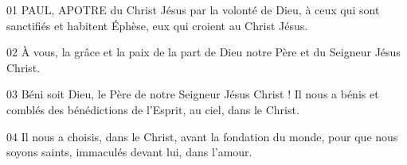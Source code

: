 01 PAUL, APOTRE du Christ Jésus par la volonté de Dieu, à ceux qui sont sanctifiés et habitent Éphèse, eux qui croient au Christ Jésus.

02 À vous, la grâce et la paix de la part de Dieu notre Père et du Seigneur Jésus Christ.

03 Béni soit Dieu, le Père de notre Seigneur Jésus Christ ! Il nous a bénis et comblés des bénédictions de l’Esprit, au ciel, dans le Christ.

04 Il nous a choisis, dans le Christ, avant la fondation du monde, pour que nous soyons saints, immaculés devant lui, dans l’amour.

